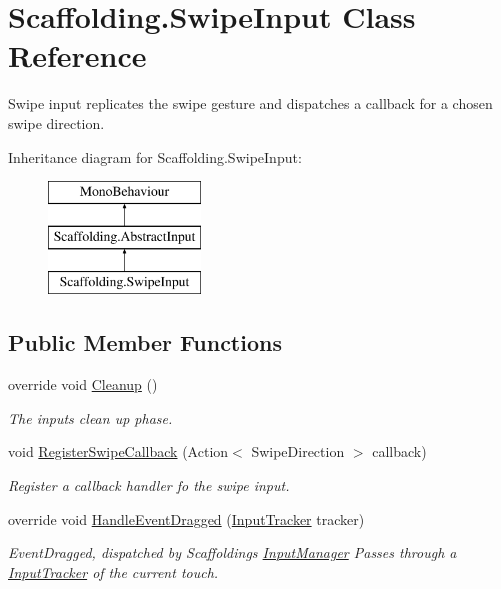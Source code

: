 \hypertarget{class_scaffolding_1_1_swipe_input}{\section{Scaffolding.\-Swipe\-Input Class Reference}
\label{class_scaffolding_1_1_swipe_input}
}


Swipe input replicates the swipe gesture and dispatches a callback for a chosen swipe direction.  


Inheritance diagram for Scaffolding.\-Swipe\-Input\-:\begin{figure}[H]
\begin{center}
\leavevmode
\includegraphics[height=3.000000cm]{class_scaffolding_1_1_swipe_input}
\end{center}
\end{figure}
\subsection*{Public Member Functions}
\begin{DoxyCompactItemize}
\item 
override void \hyperlink{class_scaffolding_1_1_swipe_input_a5d19c1744df90f14d150241605cb86bf}{Cleanup} ()
\begin{DoxyCompactList}\small\item\em The inputs clean up phase. \end{DoxyCompactList}\item 
void \hyperlink{class_scaffolding_1_1_swipe_input_a00ad2fde21a1aa47c4dbfa36768a0bc3}{Register\-Swipe\-Callback} (Action$<$ Swipe\-Direction $>$ callback)
\begin{DoxyCompactList}\small\item\em Register a callback handler fo the swipe input. \end{DoxyCompactList}\item 
override void \hyperlink{class_scaffolding_1_1_swipe_input_a818aba4106a64b5dde4977bca4b358a7}{Handle\-Event\-Dragged} (\hyperlink{class_scaffolding_1_1_input_tracker}{Input\-Tracker} tracker)
\begin{DoxyCompactList}\small\item\em Event\-Dragged, dispatched by Scaffoldings \hyperlink{class_scaffolding_1_1_input_manager}{Input\-Manager} Passes through a \hyperlink{class_scaffolding_1_1_input_tracker}{Input\-Tracker} of the current touch. \end{DoxyCompactList}\end{DoxyCompactItemize}
